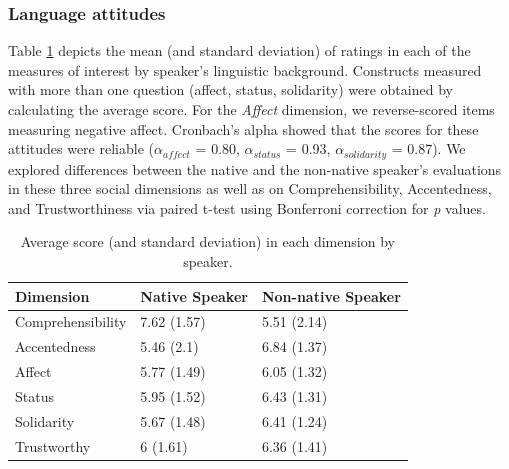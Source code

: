 \documentclass[
  man,floatsintext]{apa7}
\begin{document}
\hypertarget{language-attitudes}{%
\subsubsection{Language attitudes}\label{language-attitudes}}

Table \ref{tab:tab5} depicts the mean (and standard deviation) of ratings in each of the measures of interest by speaker's linguistic background. Constructs measured with more than one question (affect, status, solidarity) were obtained by calculating the average score. For the \emph{Affect} dimension, we reverse-scored items measuring negative affect. Cronbach's alpha showed that the scores for these attitudes were reliable (\(\alpha_{affect}\) = 0.80, \(\alpha_{status}\) = 0.93, \(\alpha_{solidarity}\) = 0.87). We explored differences between the native and the non-native speaker's evaluations in these three social dimensions as well as on Comprehensibility, Accentedness, and Trustworthiness via paired t-test using Bonferroni correction for \emph{p} values.

\begin{table}[tbp]

\begin{center}
\begin{threeparttable}

\caption{\label{tab:tab5}Average score (and standard deviation) in each dimension by speaker.}

\begin{tabular}{lll}
\toprule
Dimension & \multicolumn{1}{c}{Native Speaker} & \multicolumn{1}{c}{Non-native Speaker}\\
\midrule
Comprehensibility & 7.62 (1.57) & 5.51 (2.14)\\
Accentedness & 5.46 (2.1) & 6.84 (1.37)\\
Affect & 5.77 (1.49) & 6.05 (1.32)\\
Status & 5.95 (1.52) & 6.43 (1.31)\\
Solidarity & 5.67 (1.48) & 6.41 (1.24)\\
Trustworthy & 6 (1.61) & 6.36 (1.41)\\
\bottomrule
\end{tabular}

\end{threeparttable}
\end{center}

\end{table}
\end{document}
